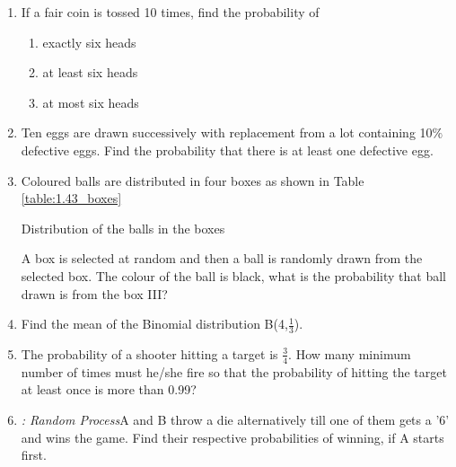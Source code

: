 \begin{enumerate}[label=\arabic*.,ref=\thesubsection.\theenumi]
\item If a fair coin is tossed 10 times, find the probability of
\begin{enumerate}
\item  exactly six heads
\item  at least six heads
\item  at most six  heads
\end{enumerate}
\solution


\item Ten eggs are drawn successively with replacement from a lot containing 10$\%$ defective eggs. Find the probability that there is at least one defective egg.\\
\solution


\item Coloured balls are distributed in four boxes as shown in Table \ref{table:1.43_boxes}

\begin{table}[ht!]
\centering

\caption{Distribution of the balls in the boxes}
\label{table:1.43_boxes}
\end{table}
A box is selected at random and then a ball is randomly drawn from the selected box. The colour of the ball is black, what is the probability that ball drawn is from the box III?
\\
\solution


\item Find the mean of the Binomial distribution B(4,$\frac{1}{3}$).
\\
\solution


\item The probability of a shooter hitting a target is $\frac{3}{4}$. How many minimum
number of times must he/she fire so that the probability of hitting the target at least
once is more than 0.99?
\\
\solution


\item {\em: Random Process}A and B throw a die alternatively till one of them gets a '6' and wins the game. Find their respective probabilities of winning, if A starts first.
\\
\solution



\end{enumerate}
